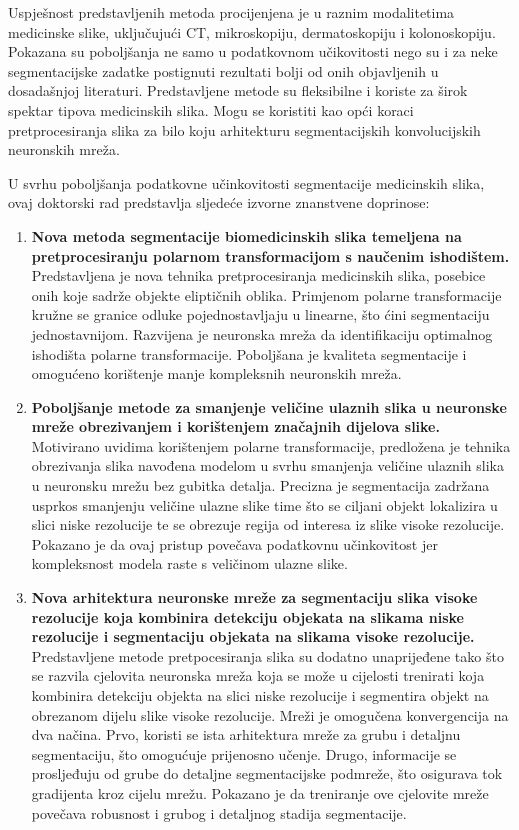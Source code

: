 Uspješnost predstavljenih metoda procijenjena je u raznim modalitetima medicinske slike, uključujući CT, mikroskopiju, dermatoskopiju i kolonoskopiju. Pokazana su poboljšanja ne samo u podatkovnom učikovitosti nego su i za neke segmentacijske zadatke postignuti rezultati bolji od onih objavljenih u dosadašnjoj literaturi. Predstavljene metode su fleksibilne i koriste za širok spektar tipova medicinskih slika. Mogu se koristiti kao opći koraci pretprocesiranja slika za bilo koju arhitekturu segmentacijskih konvolucijskih neuronskih mreža.

U svrhu poboljšanja podatkovne učinkovitosti segmentacije medicinskih slika, ovaj doktorski rad predstavlja sljedeće izvorne znanstvene doprinose:

\begin{enumerate}
	\item \textbf{Nova metoda segmentacije biomedicinskih slika temeljena na pretprocesiranju polarnom transformacijom s naučenim ishodištem.} Predstavljena je nova tehnika pretprocesiranja medicinskih slika, posebice onih koje sadrže objekte eliptičnih oblika. Primjenom polarne transformacije kružne se granice odluke pojednostavljaju u linearne, što ćini segmentaciju jednostavnijom. Razvijena je neuronska mreža da identifikaciju optimalnog ishodišta polarne transformacije. Poboljšana je kvaliteta segmentacije i omogućeno korištenje manje kompleksnih neuronskih mreža.
	\item \textbf{Poboljšanje metode za smanjenje veličine ulaznih slika u neuronske mreže obrezivanjem i korištenjem značajnih dijelova slike.} Motivirano uvidima korištenjem polarne transformacije, predložena je tehnika obrezivanja slika navođena modelom u svrhu smanjenja veličine ulaznih slika u neuronsku mrežu bez gubitka detalja. Precizna je segmentacija zadržana usprkos smanjenju veličine ulazne slike time što se ciljani objekt lokalizira u slici niske rezolucije te se obrezuje regija od interesa iz slike visoke rezolucije. Pokazano je da ovaj pristup povečava podatkovnu učinkovitost jer kompleksnost modela raste s veličinom ulazne slike.
	\item \textbf{Nova arhitektura neuronske mreže za segmentaciju slika visoke rezolucije koja kombinira detekciju objekata na slikama niske rezolucije i segmentaciju objekata na slikama visoke rezolucije.} Predstavljene metode pretpocesiranja slika su dodatno unaprijeđene tako što se razvila cjelovita neuronska mreža koja se može u cijelosti trenirati koja kombinira detekciju objekta na slici niske rezolucije i segmentira objekt na obrezanom dijelu slike visoke rezolucije. Mreži je omogučena konvergencija na dva načina. Prvo, koristi se ista arhitektura mreže za grubu i detaljnu segmentaciju, što omogućuje prijenosno učenje. Drugo, informacije se prosljeđuju od grube do detaljne segmentacijske podmreže, što osigurava tok gradijenta kroz cijelu mrežu. Pokazano je da treniranje ove cjelovite mreže povečava robusnost i grubog i detaljnog stadija segmentacije.

\end{enumerate}
